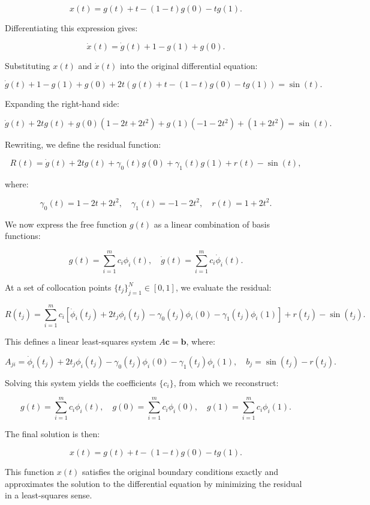 \documentclass[
  number,
  preprint]{elsarticle}
\begin{document}
\[
x(t) = g(t) + t - (1 - t)g(0) - t g(1).
\]

Differentiating this expression gives:

\[
\dot{x}(t) = \dot{g}(t) + 1 - g(1) + g(0).
\]

Substituting \(x(t)\) and \(\dot{x}(t)\) into the original differential
equation:

\[
\dot{g}(t) + 1 - g(1) + g(0) + 2t\left( g(t) + t - (1 - t)g(0) - t g(1) \right) = \sin(t).
\]

Expanding the right-hand side:

\[
\dot{g}(t) + 2t g(t) + g(0)(1 - 2t + 2t^2) + g(1)(-1 - 2t^2) + (1 + 2t^2) = \sin(t).
\]

Rewriting, we define the residual function:

\[
R(t) = \dot{g}(t) + 2t g(t) + \gamma_0(t) g(0) + \gamma_1(t) g(1) + r(t) - \sin(t),
\]

where:

\[
\gamma_0(t) = 1 - 2t + 2t^2, \quad \gamma_1(t) = -1 - 2t^2, \quad r(t) = 1 + 2t^2.
\]

We now express the free function \(g(t)\) as a linear combination of
basis functions:

\[
g(t) = \sum_{i=1}^{m} c_i \phi_i(t), \quad \dot{g}(t) = \sum_{i=1}^{m} c_i \dot{\phi}_i(t).
\]

At a set of collocation points \(\{ t_j \}_{j=1}^N \in [0,1]\), we
evaluate the residual:

\[
R(t_j) = \sum_{i=1}^{m} c_i \left[ \dot{\phi}_i(t_j) + 2t_j \phi_i(t_j) - \gamma_0(t_j)\phi_i(0) - \gamma_1(t_j)\phi_i(1) \right] + r(t_j) - \sin(t_j).
\]

This defines a linear least-squares system \(A\mathbf{c} = \mathbf{b}\),
where:

\[
A_{ji} = \dot{\phi}_i(t_j) + 2t_j \phi_i(t_j) - \gamma_0(t_j)\phi_i(0) - \gamma_1(t_j)\phi_i(1),
\quad
b_j = \sin(t_j) - r(t_j).
\]

Solving this system yields the coefficients \(\{ c_i \}\), from which we
reconstruct:

\[
g(t) = \sum_{i=1}^{m} c_i \phi_i(t),
\quad
g(0) = \sum_{i=1}^{m} c_i \phi_i(0),
\quad
g(1) = \sum_{i=1}^{m} c_i \phi_i(1).
\]

The final solution is then:

\[
x(t) = g(t) + t - (1 - t)g(0) - t g(1).
\]

This function \(x(t)\) satisfies the original boundary conditions
exactly and approximates the solution to the differential equation by
minimizing the residual in a least-squares sense.
\end{document}
